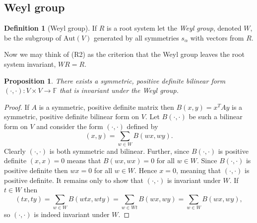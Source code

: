 \documentclass[twoside,utf8]{article}
\theoremstyle{plain}
\newtheorem{proposition}{Proposition}
\theoremstyle{definition}
\newtheorem{definition}{Definition}
\theoremstyle{remark}
\begin{document}
\begin{figure}[H]
\centering
{}
\end{figure}





\subsection{Weyl group}

\begin{definition}[Weyl group]
If $R$ is a root system let the \textit{Weyl group}, denoted $W$, be the subgroup of $\mbox{Aut}(V)$ generated by all symmetries $s_\alpha$ with vectors from $R$. 
\end{definition}

\noindent 
Now we may think of (R2) as the criterion that the Weyl group leaves the root system invariant, $WR=R$.

\begin{proposition} \label{prop:symBilinForm}
There exists a symmetric, positive definite bilinear form $(\cdot,\cdot):V\times V \rightarrow \mathbb{F}$ that is invariant under the Weyl group.
\end{proposition}
\begin{proof}
If $A$ is a symmetric, positive definite matrix then $B(x,y)=x^TAy$ is a symmetric, positive definite bilinear form on $V$.
Let $B(\cdot,\cdot)$ be such a bilinear form on $V$ and consider the form $(\cdot,\cdot)$ defined by
\[
(x,y) = \sum_{w\in W} B(wx,wy).
\]
Clearly $(\cdot,\cdot)$ is both symmetric and bilinear. Further, since $B(\cdot,\cdot)$ is positive definite $(x,x)=0$ means that $B(wx,wx)=0$ for all $w\in W$. Since $B(\cdot,\cdot)$ is positive definite then $wx=0$ for all $w\in W$. Hence $x=0$, meaning that $(\cdot,\cdot)$ is positive definite. It remains only to show that $(\cdot,\cdot)$ is invariant under $W$. If $t\in W$ then
\[
(tx,ty) = \sum_{w\in W} B(wtx,wty) = \sum_{w\in Wt} B(wx,wy) = \sum_{w\in W} B(wx,wy),
\]
so $(\cdot,\cdot)$ is indeed invariant under $W$.
\end{proof}
\end{document}
